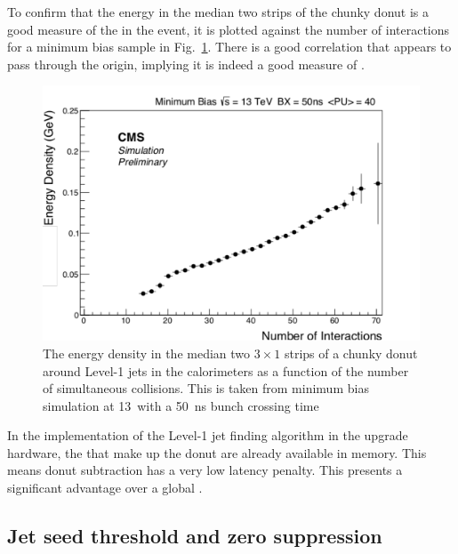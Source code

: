 To confirm that the energy in the median two strips of the  chunky
donut is a good measure of the \PU in the event, it is plotted against
the number of interactions for a minimum bias \MC sample in
Fig.~\ref{fig:donut_nint}. There is a good correlation that appears to
pass through the origin, implying it is indeed a good measure of \PU. 

\begin{figure}
	\begin{center}
		\includegraphics[width=0.8\linewidth]{figs/trigger/threestripsEdited}
  \caption{The energy density in the median two $3\times 1$ \TT strips
  of a chunky donut around Level-1 jets in the \CMS calorimeters as a
  function of the number of simultaneous collisions. This is taken
  from minimum bias \MC simulation at 13~\tev with a 50~ns bunch
  crossing time}
	\label{fig:donut_nint}
	\end{center}
\end{figure}

In the implementation of the Level-1 jet finding algorithm in the
upgrade hardware, the \TTs that make up the donut are already
available in memory. This means donut subtraction has a very low
latency penalty. This presents a significant advantage over a global
\PUS. 

\subsection{Jet seed threshold and zero suppression}

